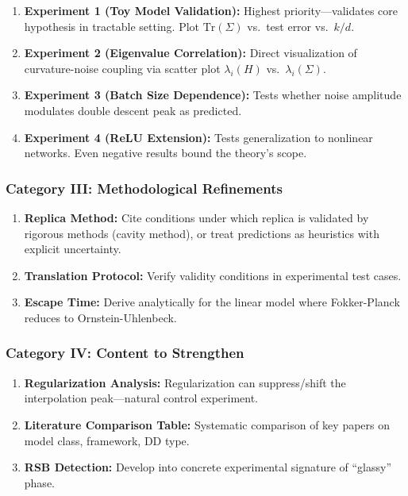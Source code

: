 \documentclass[
  journal=largetwo,
  year=2025,
  volume=37,
]{cup-journal}
\begin{document}
\begin{enumerate}
    \item \textbf{Experiment 1 (Toy Model Validation):} Highest priority---validates core hypothesis in tractable setting. Plot $\text{Tr}(\Sigma)$ vs.\ test error vs.\ $k/d$.
    
    \item \textbf{Experiment 2 (Eigenvalue Correlation):} Direct visualization of curvature-noise coupling via scatter plot $\lambda_i(H)$ vs.\ $\lambda_i(\Sigma)$.
    
    \item \textbf{Experiment 3 (Batch Size Dependence):} Tests whether noise amplitude modulates double descent peak as predicted.
    
    \item \textbf{Experiment 4 (ReLU Extension):} Tests generalization to nonlinear networks. Even negative results bound the theory's scope.
\end{enumerate}

\subsubsection*{Category III: Methodological Refinements}

\begin{enumerate}
    \item \textbf{Replica Method:} Cite conditions under which replica is validated by rigorous methods (cavity method), or treat predictions as heuristics with explicit uncertainty.
    
    \item \textbf{Translation Protocol:} Verify validity conditions in experimental test cases.
    
    \item \textbf{Escape Time:} Derive analytically for the linear model where Fokker-Planck reduces to Ornstein-Uhlenbeck.
\end{enumerate}

\subsubsection*{Category IV: Content to Strengthen}

\begin{enumerate}
    \item \textbf{Regularization Analysis:} Regularization can suppress/shift the interpolation peak---natural control experiment.
    
    \item \textbf{Literature Comparison Table:} Systematic comparison of key papers on model class, framework, DD type.
    
    \item \textbf{RSB Detection:} Develop into concrete experimental signature of ``glassy'' phase.
\end{enumerate}
\end{document}
